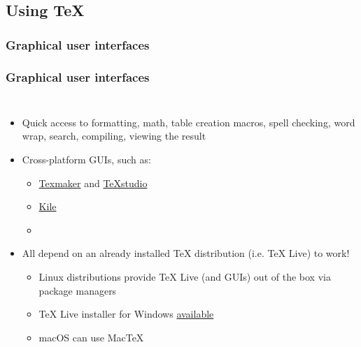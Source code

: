 \documentclass[colorlinks]{beamer} %
\begin{document}
  \subsection{Using \TeX{}}
  \subsubsection{Graphical user interfaces}
  \begin{frame}
    \frametitle{Graphical user interfaces}
    \begin{columns}
      \begin{itemize}
	\item Quick access to formatting, math, table creation macros, spell checking, word wrap, search, compiling, viewing the result
	\item Cross-platform GUIs, such as:
	\begin{itemize}
	  \item \href{http://www.xm1math.net/texmaker/}{Texmaker} and \href{http://www.texstudio.org/}{TeXstudio}
	  \item \href{http://kile.sourceforge.net/}{Kile}
	  \item \href{https://www.lyx.org/}{}
	\end{itemize}
	\item All depend on an already installed \TeX{} distribution (i.e. \TeX{} Live) to work!
	\begin{itemize}
	  \item Linux distributions provide \TeX{} Live (and GUIs) out of the box via package managers
	  \item \TeX{} Live installer for Windows \href{https://www.tug.org/texlive/acquire-netinstall.html}{available}
	  \item macOS can use Mac\TeX{}
	\end{itemize}
      \end{itemize}
      
    \end{columns}
  \end{frame}
  
\end{document}

